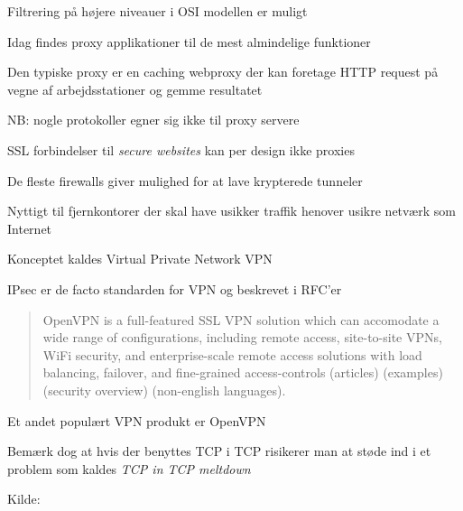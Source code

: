 
\begin{list1}
\item Filtrering på højere niveauer i OSI modellen er muligt
\item Idag findes proxy applikationer til de mest almindelige
  funktioner
\item Den typiske proxy er en caching webproxy der kan foretage HTTP
  request på vegne af arbejdsstationer og gemme resultatet 
\item NB: nogle protokoller egner sig ikke til proxy servere
\item SSL forbindelser til \emph{secure websites} kan per design ikke proxies
\end{list1}


\begin{list1}
\item De fleste firewalls giver mulighed for at lave krypterede
  tunneler
\item Nyttigt til fjernkontorer der skal have usikker traffik henover
  usikre netværk som Internet 
\item Konceptet kaldes Virtual Private Network VPN
\item IPsec er de facto standarden for VPN og beskrevet i RFC'er 
\end{list1}





\begin{quote}
OpenVPN is a full-featured SSL VPN solution which can accomodate a
wide range of configurations, including remote access, site-to-site
VPNs, WiFi security, and enterprise-scale remote access solutions with
load balancing, failover, and fine-grained access-controls (articles)
(examples) (security overview) (non-english languages).   
\end{quote}

\begin{list1}
\item Et andet populært VPN produkt er OpenVPN
\item Bemærk dog at hvis der benyttes TCP i TCP risikerer man at støde ind i 
et problem som kaldes \emph{TCP in TCP meltdown} 
\item Kilde:   
\end{list1}



